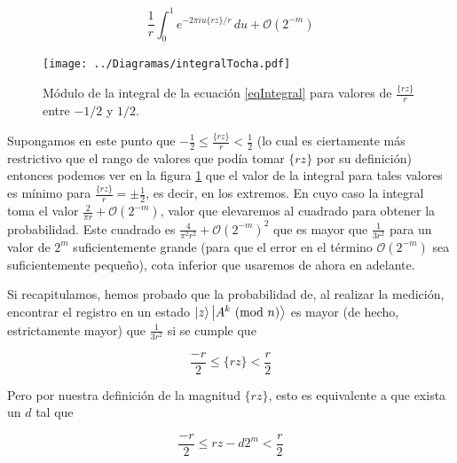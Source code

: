 \documentclass[11pt, spanish]{report}
\numberwithin{equation}{section}
\numberwithin{defin}{section}
\begin{document}
\begin{equation}\label{eqIntegral}
\frac{1}{r}\int_{0}^1e^{-2\pi i u \{rz\}/r}\,du+\mathcal{O}(2^{-m})
\end{equation}

\begin{figure}
\begin{center}
\texttt{[image: ../Diagramas/integralTocha.pdf]}
\end{center}
\caption{Módulo de la integral de la ecuación \ref{eqIntegral} para valores de $\frac{\{rz\}}{r}$ entre $-1/2$ y  $1/2$.}\label{IntegralTocha}
\end{figure}

Supongamos en este punto que $-\frac{1}{2}\leq \frac{\{rz\}}{r}<\frac{1}{2}$ (lo cual es ciertamente más restrictivo que el rango de valores que podía tomar $\{rz\}$ por su definición) entonces podemos ver en la figura \ref{IntegralTocha} que el valor de la integral para tales valores es mínimo para $\frac{\{rz\}}{r}=\pm\frac{1}{2}$, es decir, en los extremos\footnotemark{}. En cuyo caso la integral toma el valor $\frac{2}{\pi r}+\mathcal{O}(2^{-m})$, valor que elevaremos al cuadrado para obtener la probabilidad. Este cuadrado es $\frac{4}{\pi^2r^2}+\mathcal{O}(2^{-m})^2$ que es mayor que $\frac{1}{3r^2}$ para un valor de $2^m$ suficientemente grande (para que el error en el término $\mathcal{O}(2^{-m})$ sea suficientemente pequeño), cota inferior que usaremos de ahora en adelante.\\


Si recapitulamos, hemos probado que la probabilidad de, al realizar la medición, encontrar el registro en un estado $\ket{z}\ket{A^k\ (\text{mod }n)}$ es mayor (de hecho, estrictamente mayor) que $\frac{1}{3r^2}$ si se cumple que

\begin{equation}
\frac{-r}{2}\leq \{rz\} < \frac{r}{2}
\end{equation}

Pero por nuestra definición de la magnitud $\{rz\}$, esto es equivalente a que exista un $d$ tal que

\begin{equation}
\frac{-r}{2}\leq rz-d2^m < \frac{r}{2}
\end{equation}
\end{document}
